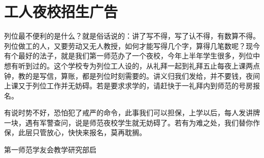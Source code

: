 \section{工人夜校招生广告}

列位最不便利的是什么？就是俗话说的：讲了写不得，写了认不得，有数算不得。列位做工的人，又要劳动又无人教授，如何才能写得几个字，算得几笔数呢？现今有个最好的法子，就是我们第一师范办了一个夜校，今年上半年学生很多，列位中想有听到过的。这个学校专为列位工人设的，从礼拜一起到礼拜五止每夜上课两点钟，教的是写信，算账，都是列位时刻需要的。讲义归我们发给，并不要钱，夜间上课又于列位工作并无妨碍。若是要求求学的，请赶快于一礼拜内到师范的号房报名。

有说时势不好，恐怕犯了戒严的命令，此事我们可以担保，上学以后，每人发讲牌一块，遇有军警查问，说是师范夜校学生就无妨碍了。若有为难之处，我们替你作保，此层只管放心，快快来报名，莫再耽搁。

\begin{flushright}第一师范学友会教学研究部启\end{flushright}
